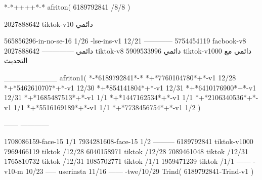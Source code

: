 *-*++++*-*
afriton(
6189792841 /8/8
)

2027888642 tiktok-v10
دائمي

565856296-in-no-se-16 1/26
-lse-ins-v1 12/21
------------
5754454119 facbook-v8
دائمي
--------------
2027888642 tiktok-v8
دائمي
5909533996 tiktok-v1000
دائمي مع التحديث

__________
afriton1(
*-*6189792841*-*
*+*7760104780*+*-v1 12/28
*+*5462610707*+*-v1 12/30
*+*854141804*+*-v1 12/31
*+*6410176900*+*-v1 12/31
*+*1685487513*+*-v1 1/1
*+*1447162534*+*-v1 1/1
*+*2106340536*+*-v1 1/1
*+*5516169189*+*-v1 1/1
*+*7738456754*+*-v1 1/2
)

------
------------

1708086159-face-15 1/1
7934281608-face-15 1/2
---------
6189792841 tiktok-v1000
7969466119 tiktok /12/28
6040158971 tiktok /12/28
7089461048 tiktok /12/31
1765810732 tiktok /12/31
1085702771 tiktok /1/1
1959471239 tiktok /1/1
------
-v10-m 10/23
-----
userinsta 11/16
------
-twe/10/29
Trind(
6189792841-Trind-v1 
)
